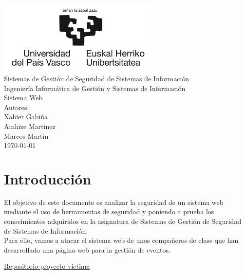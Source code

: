 \documentclass{report}
\begin{document}
    \begin{titlepage}
        \centering
        \includegraphics[width=0.6\textwidth]{./img/miscelanio/logo.jpg}\\
        \vspace{1cm}
        \LARGE Sistemas de Gestión de Seguridad de Sistemas de Información\\
        \vspace{0.5cm}
        \Large Ingeniería Informática de Gestión y Sistemas de Información\\
        \vspace{3cm}
        \Huge Sistema Web\\
        \vspace{2.5cm}
        \Large Autores:\\
        \vspace{0.2cm}
        \large Xabier Gabiña\\
        \large Ainhize Martinez\\
        \large Marcos Martín\\
        \vfill
        \today
    \end{titlepage}
    \tableofcontents
    \chapter{Introducción}
        El objetivo de este documento es analizar la seguridad de un sistema web mediante el uso de herramientas de seguridad y poniendo a prueba los conocimientos adquiridos en la asignatura de Sistemas de Gestión de Seguridad de Sistemas de Información.\\

        Para ello, vamos a atacar el sistema web de unos compañeros de clase que han desarrollado una página web para la gestión de eventos.\\
        \begin{center}
            \href{https://github.com/ImanolMM/Eventify}{Repositorio proyecto victima}
        \end{center}
        
\end{document}
